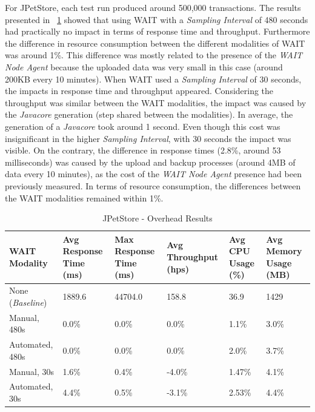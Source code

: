 \documentclass[runningheads,a4paper]{llncs}
\begin{document}
For JPetStore, each test run produced around 500,000 transactions. The results
presented in \tablename ~\ref{PetStore1} showed that using WAIT with a
\emph{Sampling Interval} of 480 seconds had practically no impact in terms of
response time and throughput. Furthermore the difference in resource consumption
between the different modalities of WAIT was around 1\%.  This difference was
mostly related to the presence of the \emph{WAIT Node Agent} because the
uploaded data was very small in this case (around 200KB every 10 minutes). When
WAIT used a \emph{Sampling Interval} of 30 seconds, the impacts in response time
and throughput appeared. Considering the throughput was similar between
the WAIT modalities, the impact was caused by the \emph{Javacore} generation
(step shared between the modalities). In average, the generation of a
\emph{Javacore} took around 1 second. Even though this cost was insignificant in the higher
\emph{Sampling Interval}, with 30 seconds the impact was visible. On the contrary, 
the difference in response times (2.8\%, around 53 milliseconds) was caused
by the upload and backup processes (around 4MB of data every 10 minutes), as the
cost of the \emph{WAIT Node Agent} presence had been previously measured. In
terms of resource consumption, the differences between the WAIT
modalities remained within 1\%.

\begin{table}[!h]
\caption{JPetStore - Overhead Results}
\label{PetStore1}
\centering
\begin{tabular}{p{}|p{}|p{}|p{}|p{}|p{}}
\hline
\bfseries WAIT Modality & \bfseries Avg Response Time (ms)& \bfseries Max
Response Time (ms)& \bfseries Avg Throughput (hps)& \bfseries Avg CPU Usage
(\%) & \bfseries Avg Memory Usage (MB)\\
\hline
None (\emph{Baseline}) 	& 1889.6	& 44704.0	& 158.8 	& 36.9 		& 1429\\
Manual, 480s 			& 0.0\% 	& 0.0\%		& 0.0\%		& 1.1\% 	& 3.0\%\\
Automated, 480s 		& 0.0\%		& 0.0\%		& 0.0\% 	& 2.0\% 	& 3.7\%\\
Manual, 30s 			& 1.6\%		& 0.4\%		& -4.0\% 	& 1.47\% 	& 4.1\%\\
Automated, 30s 			& 4.4\%		& 0.5\%		& -3.1\% 	& 2.53\% 	& 4.4\%\\
\hline
\end{tabular}
\end{table}
\end{document}
